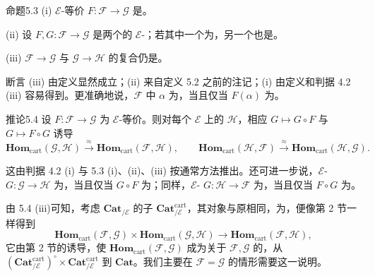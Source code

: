 \begin{SGAresult}{命题}{5.3}
\textup{(i)} $\mathcal E$-等价 $F:\mathcal F\to\mathcal G$ 是。

\textup{(ii)} 设 $F,G:\mathcal F\to\mathcal G$ 是两个的 $\mathcal E$-；若其中一个为，另一个也是。

\textup{(iii)}  $\mathcal F\to\mathcal G$ 与 $\mathcal G\to\mathcal H$ 的复合仍是。
\end{SGAresult}
断言 (iii) 由定义显然成立；(ii) 来自定义 5.2 之前的注记；(i) 由定义和判据 4.2 (iii) 容易得到。更准确地说，$\mathcal F$ 中 $\alpha$ 为，当且仅当 $F(\alpha)$ 为。

\begin{SGAresult}{推论}{5.4}
设 $F:\mathcal F\to\mathcal G$ 为 $\mathcal E$-等价。则对每个 $\mathcal E$ 上的 $\mathcal H$，相应 $G\mapsto G\circ F$ 与 $G\mapsto F\circ G$ 诱导
\[
 \mathbf{Hom}_{\mathrm{cart}}(\mathcal G,\mathcal H)\xrightarrow{\approx}
 \mathbf{Hom}_{\mathrm{cart}}(\mathcal F,\mathcal H),\qquad
 \mathbf{Hom}_{\mathrm{cart}}(\mathcal H,\mathcal F)\xrightarrow{\approx}
 \mathbf{Hom}_{\mathrm{cart}}(\mathcal H,\mathcal G).
\]
\end{SGAresult}
这由判据 4.2 (i) 与 5.3 (i)、(ii)、(iii) 按通常方法推出。还可进一步说，$\mathcal E$- $G:\mathcal G\to\mathcal H$ 为，当且仅当 $G\circ F$ 为；同样，$\mathcal E$- $G:\mathcal H\to\mathcal F$ 为，当且仅当 $F\circ G$ 为。

由 5.4 (iii)可知，考虑 $\mathbf{Cat}_{/\mathcal E}$ 的子 $\mathbf{Cat}^{\mathrm{cart}}_{/\mathcal E}$，其对象与原相同，为，便像第 2 节一样得到
\[
 \mathbf{Hom}_{\mathrm{cart}}(\mathcal F,\mathcal G)\times
 \mathbf{Hom}_{\mathrm{cart}}(\mathcal G,\mathcal H)
 \longrightarrow\mathbf{Hom}_{\mathrm{cart}}(\mathcal F,\mathcal H),
\]
它由第 2 节的诱导，使 $\mathbf{Hom}_{\mathrm{cart}}(\mathcal F,\mathcal G)$ 成为关于 $\mathcal F,\mathcal G$ 的，从 $(\mathbf{Cat}^{\mathrm{cart}}_{/\mathcal E})^\circ\times\mathbf{Cat}^{\mathrm{cart}}_{/\mathcal E}$ 到 $\mathbf{Cat}$。我们主要在 $\mathcal F=\mathcal G$ 的情形需要这一说明。

